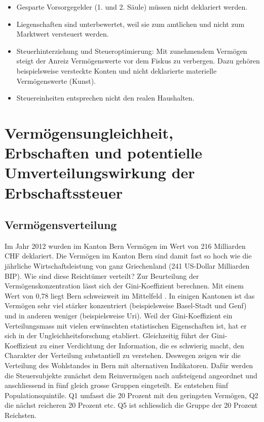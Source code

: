 \documentclass[a4paper, 12pt,liststotoc]{scrartcl}
\numberwithin{equation}{section}
\begin{document}
\begin{itemize}
\item
  Gesparte Vorsorgegelder (1. und 2. Säule) müssen nicht deklariert
  werden.
\item
  Liegenschaften sind unterbewertet, weil sie zum amtlichen und nicht
  zum Marktwert versteuert werden.
\item
  Steuerhinterziehung und Steueroptimierung: Mit zunehmendem Vermögen
  steigt der Anreiz Vermögenswerte vor dem Fiskus zu verbergen. Dazu
  gehören beispielsweise versteckte Konten und nicht deklarierte
  materielle Vermögenswerte (Kunst).
\item
  Steuereinheiten entsprechen nicht den realen Haushalten.
\end{itemize}

\section{Vermögensungleichheit, Erbschaften und potentielle
  Umverteilungswirkung der
  Erbschaftssteuer}\label{vermuxf6gensungleichheit-erbschaften-und-potentielle-umverteilungswirkung-der-erbschaftssteuer}
\subsection{Vermögensverteilung}\label{vermuxf6gensverteilung}

Im Jahr 2012 wurden im Kanton Bern Vermögen im Wert von 216 Milliarden
CHF deklariert. Die Vermögen im Kanton Bern sind damit fast so hoch wie
die jährliche Wirtschaftsleistung von ganz Griechenland (241 US-Dollar
Milliarden BIP). Wie sind diese Reichtümer verteilt? Zur Beurteilung der
Vermögenskonzentration lässt sich der Gini-Koeffizient berechnen. Mit
einem Wert von 0,78 liegt Bern schweizweit im Mittelfeld \parencite{jann2014}. In einigen Kantonen ist das Vermögen sehr viel stärker
konzentriert (beispielsweise Basel-Stadt und Genf) und in anderen
weniger (beispielsweise Uri). Weil der Gini-Koeffizient ein
Verteilungsmass mit vielen erwünschten statistischen Eigenschaften ist,
hat er sich in der Ungleichheitsforschung etabliert. Gleichzeitig führt
der Gini-Koeffizient zu einer Verdichtung der Information, die es
schwierig macht, den Charakter der Verteilung substantiell zu verstehen.
Deswegen zeigen wir die Verteilung des Wohlstandes in Bern mit
alternativen Indikatoren. Dafür werden die Steuersubjekte zunächst dem
Reinvermögen nach aufsteigend angeordnet und anschliessend in fünf
gleich grosse Gruppen eingeteilt. Es entstehen fünf Populationsquintile.
Q1 umfasst die 20 Prozent mit den geringsten Vermögen, Q2 die nächst
reicheren 20 Prozent etc. Q5 ist schliesslich die Gruppe der 20 Prozent
Reichsten.
\end{document}
